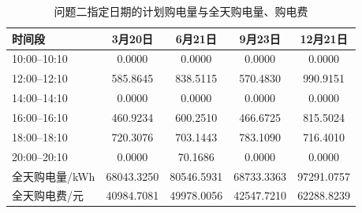 \begin{table}[H]
  \centering
  \caption{问题二指定日期的计划购电量与全天购电量、购电费}
  \label{tab:q2-purchase}
  \begin{tabular}{lcccc}
    \toprule
    时间段 & 3月20日 & 6月21日 & 9月23日 & 12月21日 \\
    \midrule
    10:00--10:10 & 0.0000 & 0.0000 & 0.0000 & 0.0000 \\
    12:00--12:10 & 585.8645 & 838.5115 & 570.4830 & 990.9151 \\
    14:00--14:10 & 0.0000 & 0.0000 & 0.0000 & 0.0000 \\
    16:00--16:10 & 460.9234 & 600.2510 & 466.6725 & 815.5024 \\
    18:00--18:10 & 720.3076 & 703.1443 & 783.1090 & 716.4010 \\
    20:00--20:10 & 0.0000 & 70.1686 & 0.0000 & 0.0000 \\
    \midrule
    全天购电量/kWh & 68043.3250 & 80546.5931 & 68733.3363 & 97291.0757 \\
    全天购电费/元 & 40984.7081 & 49978.0056 & 42547.7210 & 62288.8239 \\
    \bottomrule
  \end{tabular}
\end{table}

